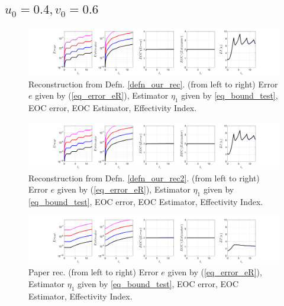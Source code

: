 \documentclass[12pt,a4paper]{article}
\numberwithin{equation}{section}
\theoremstyle{definition}
\begin{document}
\subsection*{$u_0=0.4, v_0= 0.6$}
\begin{figure}[H]
	\hspace{-3cm}
	\includegraphics[scale=0.55]{fig_LeapFrogplots_1x5_sin_IC_harmonic_order_2_u4_v6_rec_george}	
	\caption{Reconstruction from Defn. \ref{defn_our_rec}. (from left to right) Error $e$ given by (\ref{eq_error_eR}), Estimator $\eta_1$ given by \ref{eq_bound_test},  EOC error, EOC Estimator, Effectivity Index.}
	\label{fig_all_in_one_our_rec_george_u4_v6}
\end{figure}
\begin{figure}[H]
	\hspace{-3cm}
	\includegraphics[scale=0.55]{fig_LeapFrogplots_1x5_sin_IC_harmonic_order_2_u4_v6_rec2}	
	\caption{Reconstruction from Defn. \ref{defn_our_rec2}. (from left to right) Error $e$ given by (\ref{eq_error_eR}), Estimator $\eta_1$ given by \ref{eq_bound_test},  EOC error, EOC Estimator, Effectivity Index.}
	\label{fig_all_in_one_our_rec_2_u4_v6}
\end{figure}
\begin{figure}[H]
	\hspace{-3cm}
	\includegraphics[scale=0.55]{fig_LeapFrogplots_1x5_sin_IC_harmonic_u4_v6_paperrec}	
	\caption{Paper rec. (from left to right) Error $e$ given by (\ref{eq_error_eR}), Estimator $\eta_1$ given by \ref{eq_bound_test},  EOC error, EOC Estimator, Effectivity Index.}
	\label{fig_all_in_one_paperrec_u04_v06}
\end{figure}
\end{document}

